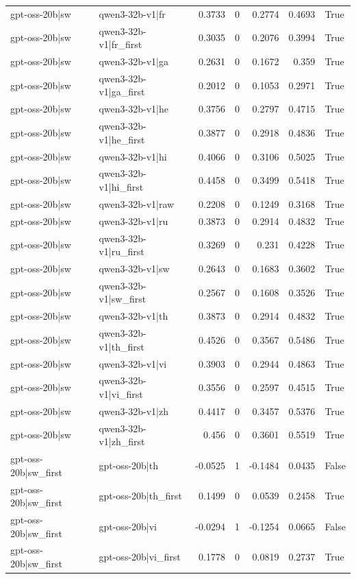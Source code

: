 \begin{table}
\begin{tabular}{l l r r r r l}
gpt-oss-20b|sw & qwen3-32b-v1|fr & 0.3733 & 0 & 0.2774 & 0.4693 & True \\
gpt-oss-20b|sw & qwen3-32b-v1|fr_first & 0.3035 & 0 & 0.2076 & 0.3994 & True \\
gpt-oss-20b|sw & qwen3-32b-v1|ga & 0.2631 & 0 & 0.1672 & 0.359 & True \\
gpt-oss-20b|sw & qwen3-32b-v1|ga_first & 0.2012 & 0 & 0.1053 & 0.2971 & True \\
gpt-oss-20b|sw & qwen3-32b-v1|he & 0.3756 & 0 & 0.2797 & 0.4715 & True \\
gpt-oss-20b|sw & qwen3-32b-v1|he_first & 0.3877 & 0 & 0.2918 & 0.4836 & True \\
gpt-oss-20b|sw & qwen3-32b-v1|hi & 0.4066 & 0 & 0.3106 & 0.5025 & True \\
gpt-oss-20b|sw & qwen3-32b-v1|hi_first & 0.4458 & 0 & 0.3499 & 0.5418 & True \\
gpt-oss-20b|sw & qwen3-32b-v1|raw & 0.2208 & 0 & 0.1249 & 0.3168 & True \\
gpt-oss-20b|sw & qwen3-32b-v1|ru & 0.3873 & 0 & 0.2914 & 0.4832 & True \\
gpt-oss-20b|sw & qwen3-32b-v1|ru_first & 0.3269 & 0 & 0.231 & 0.4228 & True \\
gpt-oss-20b|sw & qwen3-32b-v1|sw & 0.2643 & 0 & 0.1683 & 0.3602 & True \\
gpt-oss-20b|sw & qwen3-32b-v1|sw_first & 0.2567 & 0 & 0.1608 & 0.3526 & True \\
gpt-oss-20b|sw & qwen3-32b-v1|th & 0.3873 & 0 & 0.2914 & 0.4832 & True \\
gpt-oss-20b|sw & qwen3-32b-v1|th_first & 0.4526 & 0 & 0.3567 & 0.5486 & True \\
gpt-oss-20b|sw & qwen3-32b-v1|vi & 0.3903 & 0 & 0.2944 & 0.4863 & True \\
gpt-oss-20b|sw & qwen3-32b-v1|vi_first & 0.3556 & 0 & 0.2597 & 0.4515 & True \\
gpt-oss-20b|sw & qwen3-32b-v1|zh & 0.4417 & 0 & 0.3457 & 0.5376 & True \\
gpt-oss-20b|sw & qwen3-32b-v1|zh_first & 0.456 & 0 & 0.3601 & 0.5519 & True \\
gpt-oss-20b|sw_first & gpt-oss-20b|th & -0.0525 & 1 & -0.1484 & 0.0435 & False \\
gpt-oss-20b|sw_first & gpt-oss-20b|th_first & 0.1499 & 0 & 0.0539 & 0.2458 & True \\
gpt-oss-20b|sw_first & gpt-oss-20b|vi & -0.0294 & 1 & -0.1254 & 0.0665 & False \\
gpt-oss-20b|sw_first & gpt-oss-20b|vi_first & 0.1778 & 0 & 0.0819 & 0.2737 & True \\

\end{tabular}
\end{table}
